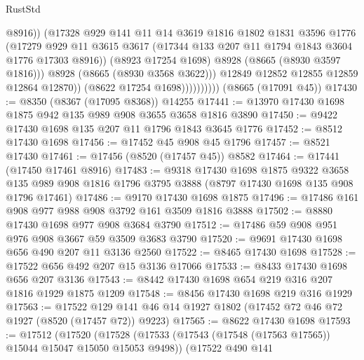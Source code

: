 \begin{lexlean}{RustStd}
\begin{coremodule}
                                @8916))
                            (@17328
                              @929
                              @141
                              @11
                              @14
                              @3619
                              @1816
                              @1802
                              @1831
                              @3596
                              @1776
                              (@17279
                                @929
                                @11
                                @3615
                                @3617
                                (@17344 @133 @207 @11 @1794 @1843 @3604 @1776 @17303 @8916))
                              (@8923 @17254 @1698)
                              @8928
                              (@8665 (@8930 @3597 @1816)))
                            @8928
                            (@8665 (@8930 @3568 @3622)))
                          @12849
                          @12852
                          @12855
                          @12859
                          @12864
                          @12870))
                      (@8622 @17254 @1698))))))))))
    (@8665 (@17091 @45))
@17430 := @8350 (@8367 (@17095 @8368)) @14255
@17441 := @13970 @17430 @1698 @1875 @942 @135 @989 @908 @3655 @3658 @1816 @3890
@17450 := @9422 @17430 @1698 @135 @207 @11 @1796 @1843 @3645 @1776
@17452 := @8512 @17430 @1698
@17456 := @17452 @45 @908 @45 @1796
@17457 := @8521 @17430
@17461 := @17456 (@8520 (@17457 @45)) @8582
@17464 := @17441 (@17450 @17461 @8916)
@17483 := @9318
    @17430
    @1698
    @1875
    @9322
    @3658
    @135
    @989
    @908
    @1816
    @1796
    @3795
    @3888
    (@8797 @17430 @1698 @135 @908 @1796 @17461)
@17486 := @9170 @17430 @1698 @1875
@17496 := @17486 @161 @908 @977 @988 @908 @3792 @161 @3509 @1816 @3888
@17502 := @8880 @17430 @1698 @977 @908 @3684 @3790
@17512 := @17486 @59 @908 @951 @976 @908 @3667 @59 @3509 @3683 @3790
@17520 := @9691 @17430 @1698 @656 @490 @207 @11 @3136 @2560
@17522 := @8465 @17430 @1698
@17528 := @17522 @656 @492 @207 @15 @3136 @17066
@17533 := @8433 @17430 @1698 @656 @207 @3136
@17543 := @8442 @17430 @1698 @654 @219 @316 @207 @1816 @1929 @1875 @1209
@17548 := @8456 @17430 @1698 @219 @316 @1929
@17563 := @17522 @129 @141 @46 @14 @1927 @1802 (@17452 @72 @46 @72 @1927 (@8520 (@17457 @72)) @9223)
@17565 := @8622 @17430 @1698
@17593 := @17512
    (@17520
      (@17528
        (@17533 (@17543 (@17548 (@17563 @17565)) @15044 @15047 @15050 @15053 @9498))
        (@17522
          @490
          @141

\end{coremodule}
\end{lexlean}
